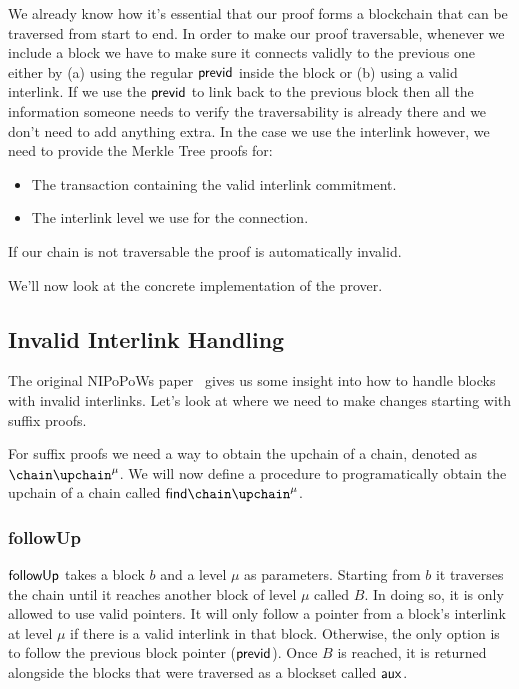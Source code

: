 We already know how it's essential that our proof forms a blockchain that can be traversed from start to end. In order to make our proof traversable, whenever we include a block we have to make sure it connects validly to the previous one either by (a) using the regular $\sf previd$ inside the block or (b) using a valid interlink. If we use the $\sf previd$ to link back to the previous block then all the information someone needs to verify the traversability is already there and we don't need to add anything extra. In the case we use the interlink however, we need to provide the Merkle Tree proofs for:

\begin{itemize}
  \item The transaction containing the valid interlink commitment.
  \item The interlink level we use for the connection.
\end{itemize}

If our chain is not traversable the proof is automatically invalid.

We'll now look at the concrete implementation of the prover.

\subsection{Invalid Interlink Handling}
The original NIPoPoWs paper~\cite{nipopows} gives us some insight into how to handle blocks with invalid interlinks. Let's look at where we need to make changes starting with suffix proofs.

For suffix proofs we need a way to obtain the upchain of a chain, denoted as $\chain\upchain^\mu$. We will now define a procedure to programatically obtain the upchain of a chain called $\sf find \chain\upchain^\mu$.

\subsubsection{followUp}
$\sf followUp$ takes a block $b$ and a level $\mu$ as parameters. Starting from $b$ it traverses the chain until it reaches another block of level $\mu$ called $B$. In doing so, it is only allowed to use valid pointers. It will only follow a pointer from a block's interlink at level $\mu$ if there is a valid interlink in that block. Otherwise, the only option is to follow the previous block pointer ($\sf previd$). Once $B$ is reached, it is returned alongside the blocks that were traversed as a blockset called $\sf aux$.

